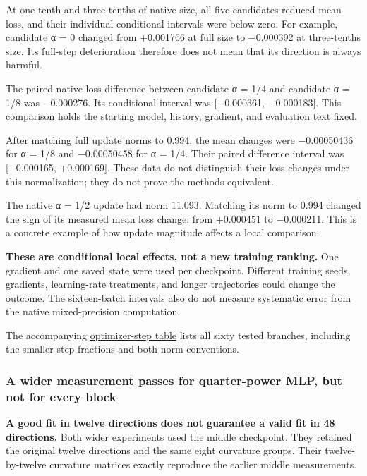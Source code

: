 \documentclass[
  14pt,
  letterpaper,
]{extarticle}
\begin{document}
At one-tenth and three-tenths of native size, all five candidates
reduced mean loss, and their individual conditional intervals were below
zero. For example, candidate α = 0 changed from +0.001766 at full size
to −0.000392 at three-tenths size. Its full-step deterioration therefore
does not mean that its direction is always harmful.

The paired native loss difference between candidate α = 1/4 and
candidate α = 1/8 was −0.000276. Its conditional interval was
{[}−0.000361, −0.000183{]}. This comparison holds the starting model,
history, gradient, and evaluation text fixed.

After matching full update norms to 0.994, the mean changes were
−0.00050436 for α = 1/8 and −0.00050458 for α = 1/4. Their paired
difference interval was {[}−0.000165, +0.000169{]}. These data do not
distinguish their loss changes under this normalization; they do not
prove the methods equivalent.

The native α = 1/2 update had norm 11.093. Matching its norm to 0.994
changed the sign of its measured mean loss change: from +0.000451 to
−0.000211. This is a concrete example of how update magnitude affects a
local comparison.

\textbf{These are conditional local effects, not a new training
ranking.} One gradient and one saved state were used per checkpoint.
Different training seeds, gradients, learning-rate treatments, and
longer trajectories could change the outcome. The sixteen-batch
intervals also do not measure systematic error from the native
mixed-precision computation.

The accompanying \href{optimizer-step-results.csv}{optimizer-step table}
lists all sixty tested branches, including the smaller step fractions
and both norm conventions.

\subsubsection{A wider measurement passes for quarter-power MLP, but not
for every
block}\label{a-wider-measurement-passes-for-quarter-power-mlp-but-not-for-every-block}

\textbf{A good fit in twelve directions does not guarantee a valid fit
in 48 directions.} Both wider experiments used the middle checkpoint.
They retained the original twelve directions and the same eight
curvature groups. Their twelve-by-twelve curvature matrices exactly
reproduce the earlier middle measurements.
\end{document}
